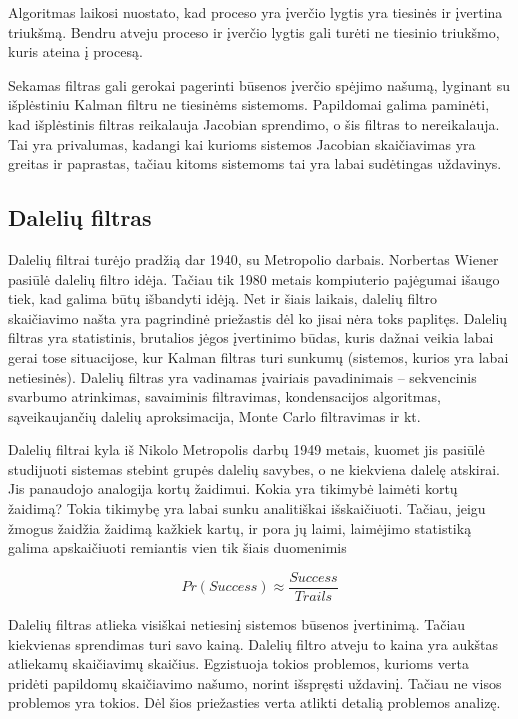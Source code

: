 Algoritmas laikosi nuostato, kad proceso yra įverčio lygtis yra tiesinės ir įvertina triukšmą.
Bendru atveju proceso ir įverčio lygtis gali turėti ne tiesinio triukšmo, kuris ateina į procesą.

Sekamas filtras gali gerokai pagerinti būsenos įverčio spėjimo našumą, lyginant su išplėstiniu Kalman filtru ne tiesinėms sistemoms.
Papildomai galima paminėti, kad išplėstinis filtras reikalauja Jacobian sprendimo, o šis filtras to nereikalauja.
Tai yra privalumas, kadangi kai kurioms sistemos Jacobian skaičiavimas yra greitas ir paprastas, tačiau kitoms sistemoms tai yra labai sudėtingas uždavinys.

\subsection{Dalelių filtras}

Dalelių filtrai turėjo pradžią dar 1940, su Metropolio darbais.
Norbertas Wiener pasiūlė dalelių filtro idėja.
Tačiau tik 1980 metais kompiuterio pajėgumai išaugo tiek, kad galima būtų išbandyti idėją.
Net ir šiais laikais, dalelių filtro skaičiavimo našta yra pagrindinė priežastis dėl ko jisai nėra toks paplitęs.
Dalelių filtras yra statistinis, brutalios jėgos įvertinimo būdas, kuris dažnai veikia labai gerai tose situacijose, kur Kalman filtras turi sunkumų (sistemos, kurios yra labai netiesinės).
Dalelių filtras yra vadinamas įvairiais pavadinimais -- sekvencinis svarbumo atrinkimas, savaiminis filtravimas, kondensacijos algoritmas, sąveikaujančių dalelių aproksimacija, Monte Carlo filtravimas ir kt.

Dalelių filtrai kyla iš Nikolo Metropolis darbų 1949 metais, kuomet jis pasiūlė studijuoti sistemas stebint grupės dalelių savybes, o ne kiekviena dalelę atskirai.
Jis panaudojo analogija kortų žaidimui.
Kokia yra tikimybė laimėti kortų žaidimą?
Tokia tikimybę yra labai sunku analitiškai išskaičiuoti.
Tačiau, jeigu žmogus žaidžia žaidimą kažkiek kartų, ir pora jų laimi, laimėjimo statistiką galima apskaičiuoti remiantis vien tik šiais duomenimis

\begin{equation}
    Pr(Success) \approx \frac{Success}{Trails}
\end{equation}

Dalelių filtras atlieka visiškai netiesinį sistemos būsenos įvertinimą.
Tačiau kiekvienas sprendimas turi savo kainą.
Dalelių filtro atveju to kaina yra aukštas atliekamų skaičiavimų skaičius.
Egzistuoja tokios problemos, kurioms verta pridėti papildomų skaičiavimo našumo, norint išspręsti uždavinį.
Tačiau ne visos problemos yra tokios.
Dėl šios priežasties verta atlikti detalią problemos analizę.


